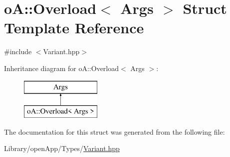 \hypertarget{structo_a_1_1_overload}{}\section{oA\+:\+:Overload$<$ Args $>$ Struct Template Reference}
\label{structo_a_1_1_overload}


{\ttfamily \#include $<$Variant.\+hpp$>$}

Inheritance diagram for oA\+:\+:Overload$<$ Args $>$\+:\begin{figure}[H]
\begin{center}
\leavevmode
\includegraphics[height=2.000000cm]{structo_a_1_1_overload}
\end{center}
\end{figure}


The documentation for this struct was generated from the following file\+:\begin{DoxyCompactItemize}
\item 
Library/open\+App/\+Types/\mbox{\hyperlink{_variant_8hpp}{Variant.\+hpp}}\end{DoxyCompactItemize}
